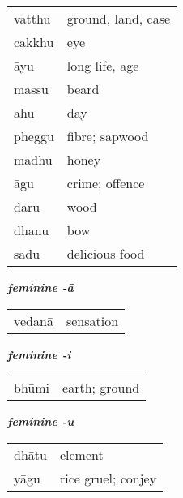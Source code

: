 \documentclass[11pt,oneside]{memoir}
\begin{document}
\begin{multicols}{3}
\begin{center}
\begin{tabular}{ll}
vatthu & ground, land, case\\[0pt]
cakkhu & eye\\[0pt]
āyu & long life, age\\[0pt]
massu & beard\\[0pt]
ahu & day\\[0pt]
pheggu & fibre; sapwood\\[0pt]
madhu & honey\\[0pt]
āgu & crime; offence\\[0pt]
dāru & wood\\[0pt]
dhanu & bow\\[0pt]
sādu & delicious food\\[0pt]
\end{tabular}
\end{center}

\end{multicols}

\bigskip

\begin{multicols}{3}

{\centering\textit{\textbf{feminine -ā}}\par}

\begin{center}
\begin{tabular}{ll}
vedanā & sensation\\[0pt]
\end{tabular}
\end{center}

\columnbreak
{\centering\textit{\textbf{feminine -i}}\par}

\begin{center}
\begin{tabular}{ll}
bhūmi & earth; ground\\[0pt]
\end{tabular}
\end{center}

\columnbreak
{\centering\textit{\textbf{feminine -u}}\par}

\begin{center}
\begin{tabular}{ll}
dhātu & element\\[0pt]
yāgu & rice gruel; conjey\\[0pt]
\end{tabular}
\end{center}

\end{multicols}
\end{document}
